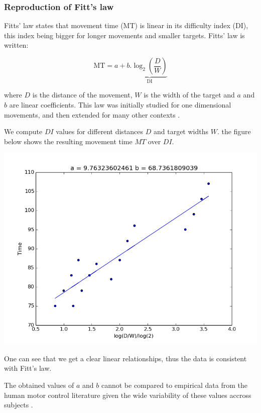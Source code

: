 \documentclass[pdftex,a4paper,12pt]{report}
\begin{document}
\subsubsection{Reproduction of Fitt's law}
Fitts' law states that movement time (MT) is linear in its difficulty index (DI), this index being bigger for longer movements and smaller targets. Fitts' law is written:

\begin{equation}
\text{MT} = a + b . \underbrace{\log_2\left(\frac{D}{W}\right)}_\text{DI}
\label{eq:fitts}
\end{equation}

where $D$ is the distance of the movement, $W$ is the width of the target and $a$ and $b$ are linear coefficients. This law was initially studied for one dimensional movements,
and then extended for many other contexts \cite{Soechting1984,Bootsma1994,Laurent1994,Plamondon1997,Smyrnis2000,Bootsma2004}.

We compute $DI$ values for different distances $D$ and target widths $W$. the figure below shows the resulting movement time $MT$ over $DI$.
\begin{center}
\includegraphics[scale=0.5]{figures/fittsLaw.png}
\end{center}
One can see that we get a clear linear relationships, thus the data is consistent with Fitt's law.

The obtained values of $a$ and $b$ cannot be compared to empirical data from the human motor control literature given the wide variability of these values accross subjects \cite{crossman1983,mackenzie1989}.
\end{document}
